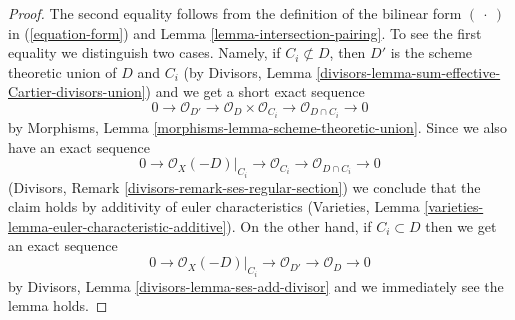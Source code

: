 \documentclass[10pt,a4paper]{amsart}
\theoremstyle{plain}
\theoremstyle{definition}
\theoremstyle{remark}
\numberwithin{equation}{subsection}
\begin{document}
\begin{proof}
The second equality follows from the definition of the bilinear form
$(\ \cdot\ )$ in (\ref{equation-form}) and
Lemma \ref{lemma-intersection-pairing}. To see the first
equality we distinguish two cases.
Namely, if $C_i \not \subset D$, then $D'$ is the scheme
theoretic union of $D$ and $C_i$ (by
Divisors, Lemma \ref{divisors-lemma-sum-effective-Cartier-divisors-union})
and we get a short exact sequence
$$
0 \to \mathcal{O}_{D'} \to
\mathcal{O}_D \times \mathcal{O}_{C_i} \to
\mathcal{O}_{D \cap C_i} \to 0
$$
by Morphisms, Lemma \ref{morphisms-lemma-scheme-theoretic-union}.
Since we also have an exact sequence
$$
0 \to \mathcal{O}_X(-D)|_{C_i} \to
\mathcal{O}_{C_i} \to \mathcal{O}_{D \cap C_i} \to 0
$$
(Divisors, Remark \ref{divisors-remark-ses-regular-section})
we conclude that the claim holds
by additivity of euler characteristics
(Varieties, Lemma \ref{varieties-lemma-euler-characteristic-additive}).
On the other hand, if $C_i \subset D$ then we get an
exact sequence
$$
0 \to \mathcal{O}_X(-D)|_{C_i} \to \mathcal{O}_{D'} \to \mathcal{O}_D \to 0
$$
by Divisors, Lemma \ref{divisors-lemma-ses-add-divisor}
and we immediately see the lemma holds.
\end{proof}
\end{document}
